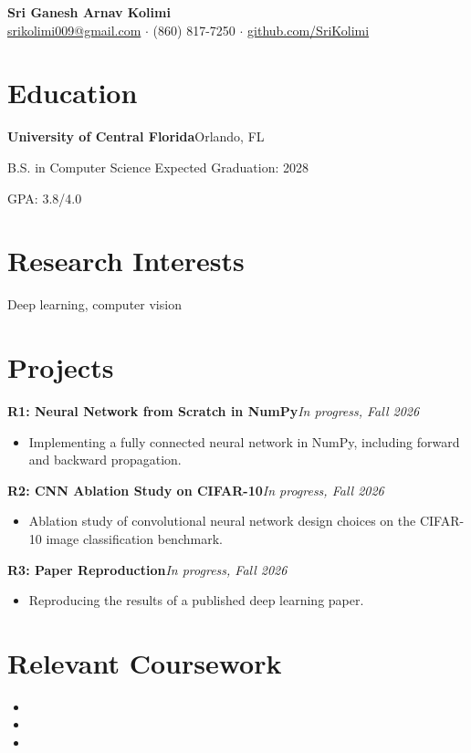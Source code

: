 \documentclass[10pt,letterpaper]{article}
\newcommand{\entry}[2]{\textbf{#1}\hfill #2\par}
\begin{document}
\begin{center}
  {\LARGE\bfseries Sri Ganesh Arnav Kolimi}\\[4pt]
  \href{mailto:srikolimi009@gmail.com}{srikolimi009@gmail.com} \;$\cdot$\; (860) 817-7250 \;$\cdot$\; \href{https://github.com/SriKolimi}{github.com/SriKolimi}
\end{center}

\section{Education}
\entry{University of Central Florida}{Orlando, FL}
B.S. in Computer Science \hfill Expected Graduation: 2028\par
GPA: 3.8/4.0

\section{Research Interests}
Deep learning, computer vision

\section{Projects}
\entry{R1: Neural Network from Scratch in NumPy}{\textit{In progress, Fall 2026}}
\begin{itemize}
  \item Implementing a fully connected neural network in NumPy, including forward and backward propagation.
\end{itemize}

\entry{R2: CNN Ablation Study on CIFAR-10}{\textit{In progress, Fall 2026}}
\begin{itemize}
  \item Ablation study of convolutional neural network design choices on the CIFAR-10 image classification benchmark.
\end{itemize}

\entry{R3: Paper Reproduction}{\textit{In progress, Fall 2026}}
\begin{itemize}
  \item Reproducing the results of a published deep learning paper.
\end{itemize}

\section{Relevant Coursework}
\begin{itemize}
  \item [COURSE]
  \item [COURSE]
  \item [COURSE]
\end{itemize}
\end{document}

